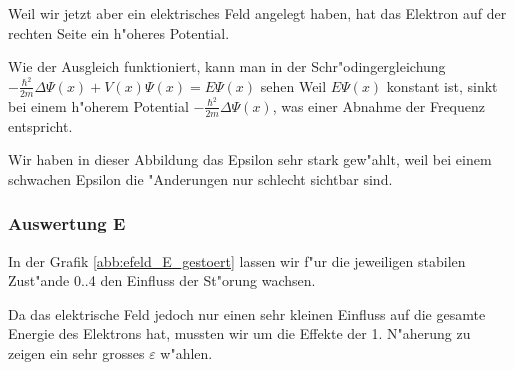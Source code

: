 \begin{refsection}
Weil wir jetzt aber ein elektrisches Feld angelegt haben, hat das Elektron auf der rechten Seite ein h"oheres Potential.

Wie der Ausgleich funktioniert, kann man in der Schr"odingergleichung 
$
-\frac{\hbar^2}{2m}\Delta\Psi(x) + V(x)\Psi(x)
=
E\Psi(x)
$ sehen
Weil $E\Psi(x)$ konstant ist, sinkt bei einem h"oherem Potential $-\frac{\hbar^2}{2m}\Delta\Psi(x)$,
was einer Abnahme der Frequenz entspricht.

Wir haben in dieser Abbildung das Epsilon sehr stark gew"ahlt,
weil bei einem schwachen Epsilon die "Anderungen nur schlecht sichtbar sind.



\subsubsection{Auswertung E}

In der Grafik \ref{abb:efeld_E_gestoert} lassen wir f"ur die jeweiligen stabilen Zust"ande 0..4 
den Einfluss der St"orung wachsen.

Da das elektrische Feld jedoch nur einen sehr kleinen Einfluss auf die gesamte Energie des 
Elektrons hat, mussten wir um die Effekte der 1. N"aherung zu zeigen ein sehr grosses $\varepsilon$
w"ahlen.


\end{refsection}
